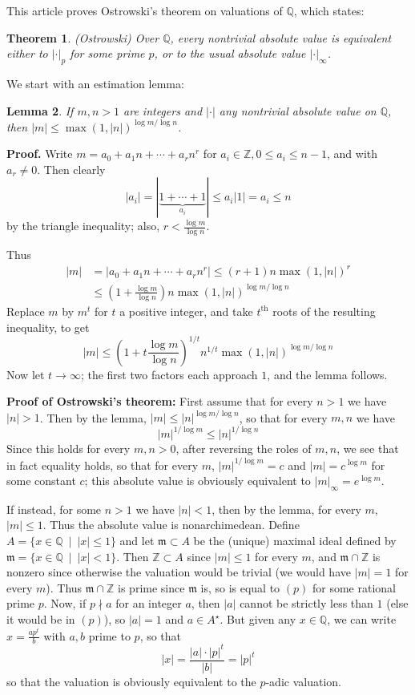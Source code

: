 \documentclass[12pt]{article}
\newcommand{\Ints}{\mathbb{Z}}
\newcommand{\Rats}{\mathbb{Q}}
\newcommand{\suchthat}{\ \mid\ }
\newcommand{\smm}{\mathfrak{m}}
\newcommand{\U}[1]{#1^{\star}}
\newcommand{\Abs}[1]{\left\lvert #1\right\rvert}
\newtheorem{thm}{Theorem}
\newtheorem{lem}[thm]{Lemma}
\begin{document}
This article proves Ostrowski's theorem on valuations of $\Rats$, which states:
\begin{thm} (Ostrowski) Over $\Rats$, every nontrivial absolute value is equivalent either to $\Abs{\cdot}_p$ for some prime $p$, or to the usual absolute value $\Abs{\cdot}_{\infty}$.
\end{thm}

We start with an estimation lemma:
\begin{lem} If $m,n>1$ are integers and $\Abs{\cdot}$ any nontrivial absolute value on $\Rats$, then $\Abs{m}\leq\max(1,\Abs n)^{\log m/\log n}$.
\end{lem}
\textbf{Proof. } Write $m=a_0+a_1n+\cdots+a_rn^r$ for $a_i\in\Ints, 0\leq a_i\leq n-1$, and with $a_r\neq 0$. Then clearly
\[
\Abs{a_i} = \Abs{\underset{a_i}{\underbrace{1+\cdots+1}}}\leq a_i\Abs 1 = a_i\leq n
\]
by the triangle inequality; also, $r < \frac{\log m}{\log n}$.

Thus
\begin{align*}
\Abs m &= \Abs{a_0+a_1n+\cdots+a_rn^r}\leq (r+1)n\max(1,\Abs n)^r\\
&\leq \left(1+\frac{\log m}{\log n}\right)n\max(1,\Abs n)^{\log m/\log n}
\end{align*}
Replace $m$ by $m^t$ for $t$ a positive integer, and take $t^{\mathrm{th}}$ roots of the resulting inequality, to get
\[\Abs m \leq \left(1+t\frac{\log m}{\log n}\right)^{1/t}n^{1/t}\max(1,\Abs n)^{\log m/\log n}\]
Now let $t\to\infty$; the first two factors each approach $1$, and the lemma follows.

\textbf{Proof of Ostrowski's theorem: }
\newline
First assume that for every $n>1$ we have $\Abs n>1$. Then by the lemma, $\Abs m\leq \Abs{n}^{\log m/\log n}$, so that for every $m,n$ we have
\[\Abs{m}^{1/\log m} \leq \Abs{n}^{1/\log n}\]
Since this holds for every $m,n>0$, after reversing the roles of $m,n$, we see that in fact equality holds, so that for every $m$, $\Abs{m}^{1/\log m}=c$ and $\Abs m=c^{\log m}$ for some constant $c$; this absolute value is obviously equivalent to $\Abs{m}_{\infty}=e^{\log m}$.

If instead, for some $n>1$ we have $\Abs n<1$, then by the lemma, for every $m$, $\Abs m \leq 1$. Thus the absolute value is nonarchimedean. Define $A=\{x\in \Rats\suchthat \Abs x\leq 1\}$ and let $\smm\subset A$ be the (unique) maximal ideal defined by $\smm = \{x\in\Rats\suchthat \Abs x<1\}$. Then $\Ints\subset A$ since $\Abs m \leq 1$ for every $m$, and $\smm\cap\Ints$ is nonzero since otherwise the valuation would be trivial (we would have $\Abs m = 1$ for every $m$). Thus $\smm\cap\Ints$ is prime since $\smm$ is, so is equal to $(p)$ for some rational prime $p$. Now, if $p\nmid a$ for an integer $a$, then $\Abs a$ cannot be strictly less than $1$ (else it would be in $(p)$), so $\Abs a =1$ and $a\in\U{A}$. But given any $x\in\Rats$, we can write $x=\frac{ap^t}{b}$ with $a,b$ prime to $p$, so that
\[\Abs x = \frac{\Abs a \cdot \Abs{p}^t}{\Abs b} = \Abs{p}^t\]
so that the valuation is obviously equivalent to the $p$-adic valuation.
\end{document}
